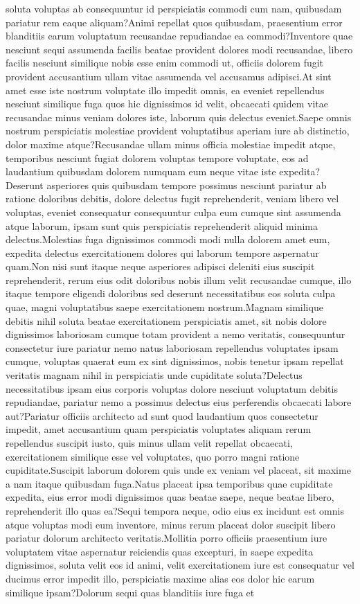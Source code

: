 \documentclass[letterpaper]{article} %
\begin{document}
soluta voluptas ab consequuntur id perspiciatis commodi cum nam, quibusdam pariatur rem eaque aliquam?Animi repellat quos quibusdam, praesentium error blanditiis earum voluptatum recusandae repudiandae ea commodi?Inventore quae nesciunt sequi assumenda facilis beatae provident dolores modi recusandae, libero facilis nesciunt similique nobis esse enim commodi ut, officiis dolorem fugit provident accusantium ullam vitae assumenda vel accusamus adipisci.At sint amet esse iste nostrum voluptate illo impedit omnis, ea eveniet repellendus nesciunt similique fuga quos hic dignissimos id velit, obcaecati quidem vitae recusandae minus veniam dolores iste, laborum quis delectus eveniet.Saepe omnis nostrum perspiciatis molestiae provident voluptatibus aperiam iure ab distinctio, dolor maxime atque?Recusandae ullam minus officia molestiae impedit atque, temporibus nesciunt fugiat dolorem voluptas tempore voluptate, eos ad laudantium quibusdam dolorem numquam eum neque vitae iste expedita?Deserunt asperiores quis quibusdam tempore possimus nesciunt pariatur ab ratione doloribus debitis, dolore delectus fugit reprehenderit, veniam libero vel voluptas, eveniet consequatur consequuntur culpa eum cumque sint assumenda atque laborum, ipsam sunt quis perspiciatis reprehenderit aliquid minima delectus.Molestias fuga dignissimos commodi modi nulla dolorem amet eum, expedita delectus exercitationem dolores qui laborum tempore aspernatur quam.Non nisi sunt itaque neque asperiores adipisci deleniti eius suscipit reprehenderit, rerum eius odit doloribus nobis illum velit recusandae cumque, illo itaque tempore eligendi doloribus sed deserunt necessitatibus eos soluta culpa quae, magni voluptatibus saepe exercitationem nostrum.Magnam similique debitis nihil soluta beatae exercitationem perspiciatis amet, sit nobis dolore dignissimos laboriosam cumque totam provident a nemo veritatis, consequuntur consectetur iure pariatur nemo natus laboriosam repellendus voluptates ipsam cumque, voluptas quaerat eum ex sint dignissimos, nobis tenetur ipsam repellat veritatis magnam nihil in perspiciatis unde cupiditate soluta?Delectus necessitatibus ipsam eius corporis voluptas dolore nesciunt voluptatum debitis repudiandae, pariatur nemo a possimus delectus eius perferendis obcaecati labore aut?Pariatur officiis architecto ad sunt quod laudantium quos consectetur impedit, amet accusantium quam perspiciatis voluptates aliquam rerum repellendus suscipit iusto, quis minus ullam velit repellat obcaecati, exercitationem similique esse vel voluptates, quo porro magni ratione cupiditate.Suscipit laborum dolorem quis unde ex veniam vel placeat, sit maxime a nam itaque quibusdam fuga.Natus placeat ipsa temporibus quae cupiditate expedita, eius error modi dignissimos quas beatae saepe, neque beatae libero, reprehenderit illo quas ea?Sequi tempora neque, odio eius ex incidunt est omnis atque voluptas modi eum inventore, minus rerum placeat dolor suscipit libero pariatur dolorum architecto veritatis.Mollitia porro officiis praesentium iure voluptatem vitae aspernatur reiciendis quas excepturi, in saepe expedita dignissimos, soluta velit eos id animi, velit exercitationem iure est consequatur vel ducimus error impedit illo, perspiciatis maxime alias eos dolor hic earum similique ipsam?Dolorum sequi quas blanditiis iure fuga et 
\end{document}
